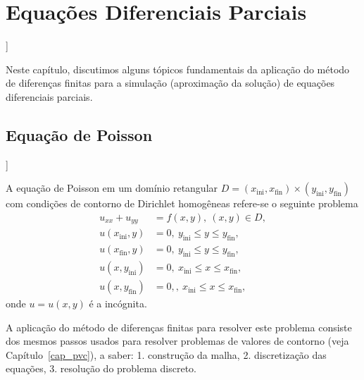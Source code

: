 
\chapter{Equações Diferenciais Parciais}\label{cap_edp}
\thispagestyle{fancy}

\begin{flushleft}
  [[tag:revisar]]
\end{flushleft}

Neste capítulo, discutimos alguns tópicos fundamentais da aplicação do método de diferenças finitas para a simulação (aproximação da solução) de equações diferenciais parciais.

\section{Equação de Poisson}\label{cap_edp_sec_Poisson}

\begin{flushleft}
  [[tag:revisar]]
\end{flushleft}

A equação de Poisson em um domínio retangular $D = (x_{\text{ini}}, x_{\text{fin}})\times (y_{\text{ini}}, y_{\text{fin}})$ com condições de contorno de Dirichlet homogêneas refere-se o seguinte problema
\begin{align}
  u_{xx} + u_{yy} &= f(x, y),~(x, y)\in D, \label{eq:edp_Poisson_eq}\\
  u(x_{\text{ini}}, y) &= 0,~y_{\text{ini}}\leq y \leq y_{\text{fin}},\label{eq:edp_Poisson_bcxini}\\
  u(x_{\text{fin}}, y) &= 0,~y_{\text{ini}}\leq y \leq y_{\text{fin}},\label{eq:edp_Poisson_bcxfin}\\
  u(x, y_{\text{ini}}) &= 0,~x_{\text{ini}}\leq x \leq x_{\text{fin}},\label{eq:edp_Poisson_bcyini}\\
  u(x, y_{\text{fin}}) &= 0,,~x_{\text{ini}}\leq x \leq x_{\text{fin}},\label{eq:edp_Poisson_bcyfin}
\end{align}
onde $u = u(x,y)$ é a incógnita.

A aplicação do método de diferenças finitas para resolver este problema consiste dos mesmos passos usados para resolver problemas de valores de contorno (veja Capítulo~\ref{cap_pvc}), a saber: 1. construção da malha, 2. discretização das equações, 3. resolução do problema discreto.

